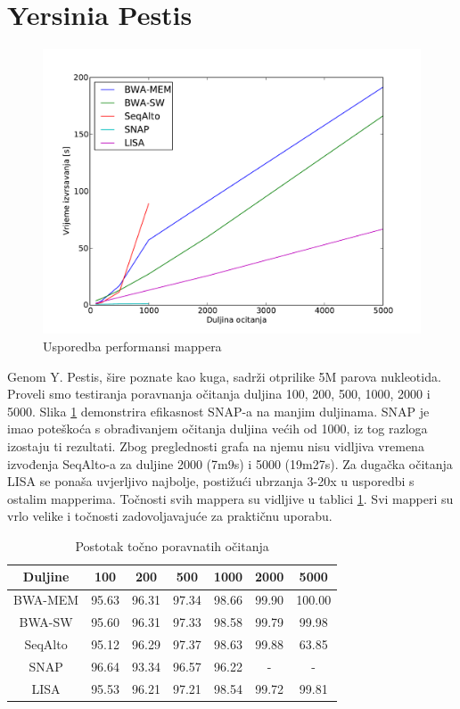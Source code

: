 \documentclass[times, utf8, diplomski]{fer}
\begin{document}
\section {Yersinia Pestis}

\begin{figure}[H]
\centering
\includegraphics[width=1.0\textwidth]{../img/yersinia-time.pdf}
\caption{Usporedba performansi mappera}\label{yersinia-time}
\end{figure}

Genom Y. Pestis, šire poznate kao kuga, sadrži otprilike 5M parova nukleotida. Proveli smo testiranja poravnanja očitanja duljina 100, 200, 500, 1000, 2000 i 5000. Slika \ref{yersinia-time} demonstrira efikasnost SNAP-a na manjim duljinama. SNAP je imao poteškoća s obrađivanjem očitanja duljina većih od 1000, iz tog razloga izostaju ti rezultati. Zbog preglednosti grafa na njemu nisu vidljiva vremena izvođenja SeqAlto-a za duljine 2000 (7m9s) i 5000 (19m27s). Za dugačka očitanja LISA se ponaša uvjerljivo najbolje, postižući ubrzanja 3-20x u usporedbi s ostalim mapperima. Točnosti svih mappera su vidljive u tablici \ref{yersinia-correct}. Svi mapperi su vrlo velike i točnosti zadovoljavajuće za praktičnu uporabu.

\begin{table}[H]
\centering
\begin{tabular}{|c||c|c|c|c|c|c|}
\hline
	Duljine & 100 & 200 & 500 & 1000 & 2000 & 5000\\
\hline
\hline
	BWA-MEM & 95.63 & 96.31 & 97.34 & 98.66 & 99.90 & 100.00\\
\hline
	BWA-SW  & 95.60 & 96.31 & 97.33 & 98.58 & 99.79 & 99.98\\
\hline
	SeqAlto & 95.12 & 96.29 & 97.37 & 98.63 & 99.88 & 63.85\\
\hline
	SNAP    & 96.64 & 93.34 & 96.57 & 96.22 & - & -\\
\hline
	LISA    & 95.53 & 96.21 & 97.21 & 98.54 & 99.72 & 99.81\\
\hline
\end{tabular}
\caption{Postotak točno poravnatih očitanja}\label{yersinia-correct}
\end{table}
\end{document}
